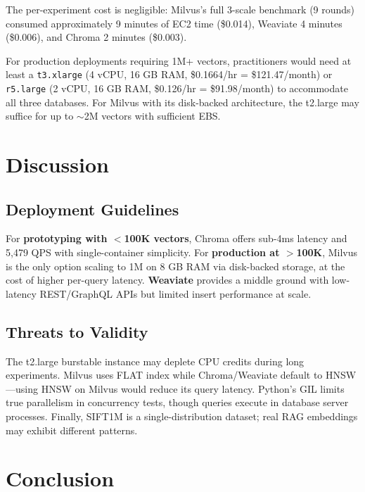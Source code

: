 \documentclass[12pt,a4paper]{article}
\begin{document}
The per-experiment cost is negligible: Milvus's full 3-scale benchmark (9 rounds) consumed approximately 9 minutes of EC2 time (\$0.014), Weaviate 4 minutes (\$0.006), and Chroma 2 minutes (\$0.003).

For production deployments requiring 1M+ vectors, practitioners would need at least a \texttt{t3.xlarge} (4 vCPU, 16 GB RAM, \$0.1664/hr = \$121.47/month) or \texttt{r5.large} (2 vCPU, 16 GB RAM, \$0.126/hr = \$91.98/month) to accommodate all three databases. For Milvus with its disk-backed architecture, the t2.large may suffice for up to $\sim$2M vectors with sufficient EBS.

\section{Discussion}

\subsection{Deployment Guidelines}

For \textbf{prototyping with $<$100K vectors}, Chroma offers sub-4ms latency and 5,479 QPS with single-container simplicity. For \textbf{production at $>$100K}, Milvus is the only option scaling to 1M on 8 GB RAM via disk-backed storage, at the cost of higher per-query latency. \textbf{Weaviate} provides a middle ground with low-latency REST/GraphQL APIs but limited insert performance at scale.

\subsection{Threats to Validity}

The t2.large burstable instance may deplete CPU credits during long experiments. Milvus uses FLAT index while Chroma/Weaviate default to HNSW---using HNSW on Milvus would reduce its query latency. Python's GIL limits true parallelism in concurrency tests, though queries execute in database server processes. Finally, SIFT1M is a single-distribution dataset; real RAG embeddings may exhibit different patterns.

\section{Conclusion}
\end{document}
